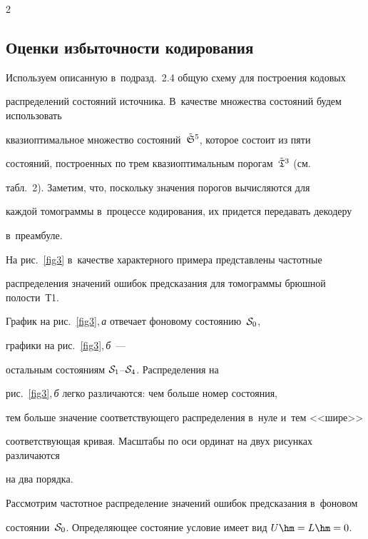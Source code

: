 \begin{multicols}{2}
{



}



\subsection{Оценки избыточности кодирования}



Используем описанную в~подразд.~2.4 общую схему для построения кодовых 

распределений состо\-яний источника. В~качестве множества состояний будем использовать 

квазиоптимальное множество со\-сто\-яний~${\tilde{\frak S}^5}$, которое состоит из пяти 

со\-сто\-яний, построенных по трем квазиоптимальным порогам~${\tilde{\frak T}^3}$ (см.\

  табл.~2). Заметим, что, поскольку значения порогов вычисляются для

   каждой томограммы в~процессе кодирования, их придется передавать декодеру 

   в~преамбуле.



На рис.~\ref{fig3} в~качестве характерного примера представлены частотные 

распределения значений ошибок предсказания для томограммы брюшной полости~Т1. 

График на рис.~\ref{fig3},\,\textit{а} отвечает фоновому состоянию~${\cal S}_0$, 

графики на рис.~\ref{fig3},\,\textit{б}~--- 

остальным состояниям ${\cal S}_1$--${\cal S}_4$. Распределения на 

рис.~\ref{fig3},\,\textit{б} легко различаются: чем больше номер состояния, 

тем больше значение соответствующего распределения в~нуле и~тем <<шире>> 

соответствующая кривая. Масштабы по оси ординат на двух рисунках различаются 

на два порядка.







Рассмотрим частотное распределение значений ошибок предсказания в~фоновом 

состоянии~${\cal S}_0$. Определяющее состояние условие имеет вид $U\hm=L\hm=0$. 


\end{multicols}
